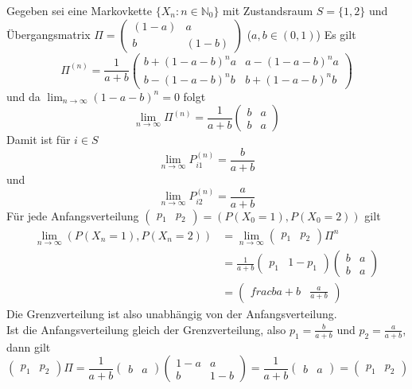 \documentclass[a4paper,12pt]{article}
\begin{document}
\begin{tcolorbox}[breakable, colframe=blue, colback=white, title=Beispiel 11]
	Gegeben sei eine Markovkette $\{X_n: n \in \mathbb{N}_0\}$ mit Zustandsraum
	$S = \{1,2\}$ und Übergangsmatrix $\Pi = \begin{pmatrix} (1-a) & a \\ b & (1-b) \end{pmatrix}$ ($a,b \in (0,1)$)
	Es gilt
	$$
		\Pi^{(n)} = \frac{1}{a+b}\begin{pmatrix}
			b + (1-a-b)^na & a-(1-a-b)^na   \\
			b - (1-a-b)^nb & b + (1-a-b)^nb
		\end{pmatrix}
	$$
	und da $\lim_{n \to \infty}(1-a-b)^n = 0$ folgt
	$$
		\lim_{n \to \infty}\Pi^{(n)} = \frac{1}{a+b} \begin{pmatrix}b & a \\ b & a \end{pmatrix}
	$$
	Damit ist für $i \in S$
	$$
		\lim_{n \to \infty}P_{i1}^{(n)} = \frac{b}{a+b}
	$$
	und
	$$
		\lim_{n \to \infty}P_{i2}^{(n)} = \frac{a}{a+b}
	$$
	Für jede Anfangsverteilung $\begin{pmatrix}p_1 & p_2 \end{pmatrix} = (P(X_0 = 1), P(X_0 = 2))$ gilt
	\begin{align*}
		\lim_{n \to \infty} (P(X_n = 1), P(X_n = 2)) & = \lim_{n \to \infty}\begin{pmatrix}p_1 & p_2 \end{pmatrix}\Pi^n                                     \\
		                                             & = \frac{1}{a+b}\begin{pmatrix}p_1 & 1-p_1 \end{pmatrix} \begin{pmatrix} b & a \\ b & a \end{pmatrix} \\
		                                             & = \begin{pmatrix}frac{b}{a+b} & \frac{a}{a+b} \end{pmatrix}
	\end{align*}
	Die Grenzverteilung ist also unabhängig von der Anfangsverteilung.\\
	Ist die Anfangsverteilung gleich der Grenzverteilung, also
	$p_1 = \frac{b}{a+b}$ und $p_2 = \frac{a}{a+b}$, dann gilt
	$$
		\begin{pmatrix}p_1 & p_2 \end{pmatrix}  \Pi = \frac{1}{a+b} \begin{pmatrix}b & a   \end{pmatrix}\begin{pmatrix}1-a & a \\ b & 1-b \end{pmatrix} =\frac{1}{a+b}\begin{pmatrix}b & a   \end{pmatrix} = \begin{pmatrix}p_1 & p_2 \end{pmatrix}
$$
\end{tcolorbox}
\end{document}
